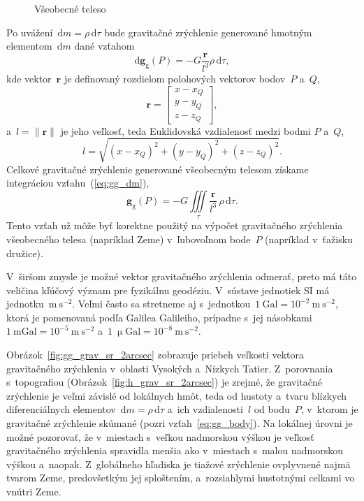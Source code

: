 \documentclass[a4paper,12pt]{book}
\newcommand{\diff}{\mathrm d}
\newcommand{\gidx}{\mathrm g}
\let\vec\mathbf
\begin{document}
\begin{figure}
\centering

\caption{Všeobecné teleso}
\label{fig:gravitating_body}
\end{figure}

Po uvážení~$\diff m = \rho \, \diff \tau$ bude gravitačné zrýchlenie generované
hmotným elementom~$\diff m$ dané vzťahom
%
\begin{equation}
\label{eq:gg_dm}
\diff \vec g_\gidx(P) = -G \frac{\vec r}{l^3} \rho \, \diff\tau{,}
\end{equation}
%
kde vektor~$\vec r$ je definovaný rozdielom polohových vektorov bodov~$P$
a~$Q$,
%
\begin{equation}
\label{eq:r}
\vec r =
%
\begin{bmatrix}
x - x_Q \\
y - y_Q \\
z - z_Q
\end{bmatrix}
{,}
\end{equation}
%
a~$l = \| \vec r \|$ je jeho veľkosť, teda Euklidovská vzdialenosť medzi bodmi
$P$ a~$Q$,
%
\begin{equation}
\label{eq:l}
l = \sqrt{(x - x_Q)^2 + (y - y_Q)^2 + (z - z_Q)^2}{.}
\end{equation}
%
Celkové gravitačné zrýchlenie generované všeobecným telesom získame
integráciou vzťahu~(\ref{eq:gg_dm}),
%
\begin{equation}
\label{eq:gg_body}
\vec g_\gidx(P) = -G \iiint\limits_{\tau} \frac{\vec r}{l^3} \, \rho \, 
\diff\tau{.}
\end{equation}
%
Tento vzťah už môže byť korektne použitý na výpočet gravitačného zrýchlenia 
všeobecného telesa (napríklad Zeme) v~ľubovoľnom bode~$P$ (napríklad v~ťažisku 
družice).

V~širšom zmysle je možné vektor gravitačného zrýchlenia odmerať, preto má táto 
veličina kľúčový význam pre fyzikálnu geodéziu.  V~sústave jednotiek SI má 
jednotku~$\mathrm{m}\ \mathrm{s}^{-2}$.  Veľmi často sa stretneme aj 
s~jednotkou~$1\ \mathrm{Gal} = 10^{-2}\ \mathrm{m}\ \mathrm{s}^{-2}$, ktorá je 
pomenovaná podľa Galilea Galileiho, prípadne s~jej násobkami~$1\ \mathrm{mGal} 
= 10^{-5}\ \mathrm{m}\ \mathrm{s}^{-2}$ a~$1\ \upmu \mathrm{Gal} = 10^{-8}\ 
\mathrm{m}\ \mathrm{s}^{-2}$.

Obrázok~\ref{fig:gg_grav_sr_2arcsec} zobrazuje priebeh veľkosti vektora
gravitačného zrýchlenia v~oblasti Vysokých a~Nízkych Tatier.  Z~porovnania
s~topografiou (Obrázok~\ref{fig:h_grav_sr_2arcsec}) je zrejmé, že gravitačné
zrýchlenie je veľmi závislé od lokálnych hmôt, teda od hustoty a~tvaru blízkych
diferenciálnych elementov~$\diff m = \rho \, \diff \tau$ a~ich vzdialenosti~$l$
od bodu~$P$, v~ktorom je gravitačné zrýchlenie skúmané (pozri
vzťah~\ref{eq:gg_body}).  Na lokálnej úrovni je možné pozorovať, že v~miestach
s~veľkou nadmorskou výškou je veľkosť gravitačného zrýchlenia spravidla menšia
ako v~miestach s~malou nadmorskou výškou a~naopak.  Z~globálneho hľadiska je
tiažové zrýchlenie ovplyvnené najmä tvarom Zeme, predovšetkým jej sploštením,
a~rozsiahlymi hustotnými celkami vo vnútri Zeme.
\end{document}

